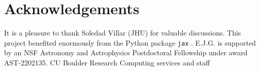 \documentclass[modern]{aastex631}
\begin{document}
\section{Acknowledgements}
It is a pleasure to thank
  Soledad Villar (JHU)
for valuable discussions.
This project benefited enormously from the Python package \texttt{jax} \citep{jax}.
E.J.G. is supported by an NSF Astronomy and Astrophysics Postdoctoral Fellowship under award AST-2202135.
CU Boulder Research Computing services and staff


{}

\end{document}
